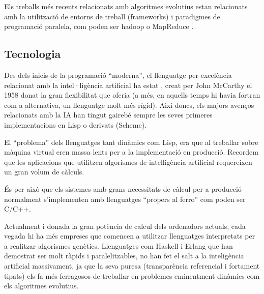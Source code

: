 Els treballs més recents relacionats amb algoritmes evolutius estan relacionats
amb la utilització de entorns de treball (frameworks) i paradigmes de
programació paralela, com poden ser hadoop o MapReduce \cite{VLCG09}.

\subsection{Tecnologia} %
\label{sub:Tecnologia}

Des dels inicis de la programació ``moderna'', el llenguatge per excelència
relacionat amb la intel·ligència artificial ha estat \cite{JMC59}, creat per John
McCarthy el 1958 donat la gran flexibilitat que oferia (a més, en aquells temps
hi havia fortran com a alternativa, un llenguatge molt més rígid).  Així doncs,
els majors avenços relacionats amb la IA han tingut gairebé sempre les seves
primeres implementacions en Lisp o derivats (Scheme).  

El ``problema'' dels llenguatges tant dinàmics com Lisp, era que al treballar sobre
màquina virtual eren massa lents per a la implementació en producció.  Recordem que les
aplicacions que utilitzen algorismes de intelligència artificial requereixen un
gran volum de càlculs.

És per això que els sistemes amb grans necessitats de càlcul per a producció
normalment s'implementen amb llenguatges ``propers al ferro'' com poden ser
C/C++. 

Actualment i donada la gran potència de calcul dels ordenadors actuals, cada
vegada hi ha més empreses que comencen a utilitzar llenguatges interpretats per
a realitzar algorismes genètics. Llenguatges com Haskell i Erlang que han
demostrat ser molt ràpids i paralelitzables, no han fet el salt a la
inteligència artificial massivament, ja que la seva puresa (transparència
referencial i fortament tipats) els fa més ferragosos de treballar en problemes
eminentment dinàmics com els algoritmes evolutius.


% 
%


%

